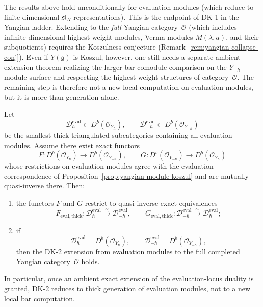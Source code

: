 \begin{remark}
\label{rem:yangian-cat-O-conditional}
The results above hold unconditionally for
evaluation modules (which reduce to finite-dimensional
$\mathfrak{sl}_N$-representations). This is the endpoint of DK-1 in
the Yangian ladder. Extending to
the \emph{full} Yangian category~$\mathcal{O}$ (which
includes infinite-dimensional highest-weight modules,
Verma modules $M(\lambda, a)$, and their subquotients) requires
the Koszulness conjecture
\textup{(}Remark~\ref{rem:yangian-collapse-conj}\textup{)}.
Even if $Y(\mathfrak{g})$ is Koszul, however, one still needs a
separate ambient extension theorem realizing the larger bar-comodule
comparison on the $Y_{-\hbar}$ module surface and respecting the
highest-weight structures of category~$\mathcal{O}$. The remaining
step is therefore not a new local computation on evaluation modules,
but it is more than generation alone.
\end{remark}

\begin{proposition}
\label{prop:yangian-dk2-thick-generation}
Let
\[
\mathcal{D}_{\hbar}^{\mathrm{eval}}
\subset D^b(\mathcal{O}_{Y_\hbar}),
\qquad
\mathcal{D}_{-\hbar}^{\mathrm{eval}}
\subset D^b(\mathcal{O}_{Y_{-\hbar}})
\]
be the smallest thick triangulated subcategories containing all
evaluation modules. Assume there exist exact functors
\[
F\colon D^b(\mathcal{O}_{Y_\hbar}) \to D^b(\mathcal{O}_{Y_{-\hbar}}),
\qquad
G\colon D^b(\mathcal{O}_{Y_{-\hbar}}) \to D^b(\mathcal{O}_{Y_\hbar})
\]
whose restrictions on evaluation modules agree with the evaluation
correspondence of Proposition~\ref{prop:yangian-module-koszul} and are
mutually quasi-inverse there. Then:
\begin{enumerate}[label=\textup{(\roman*)}]
\item the functors $F$ and $G$ restrict to quasi-inverse exact
 equivalences
 \[
 F_{\mathrm{eval,thick}}\colon
 \mathcal{D}_{\hbar}^{\mathrm{eval}}
 \xrightarrow{\sim}
 \mathcal{D}_{-\hbar}^{\mathrm{eval}},
 \qquad
 G_{\mathrm{eval,thick}}\colon
 \mathcal{D}_{-\hbar}^{\mathrm{eval}}
 \xrightarrow{\sim}
 \mathcal{D}_{\hbar}^{\mathrm{eval}};
 \]
\item if
 \[
 \mathcal{D}_{\hbar}^{\mathrm{eval}}
 = D^b(\mathcal{O}_{Y_\hbar}),
 \qquad
 \mathcal{D}_{-\hbar}^{\mathrm{eval}}
 = D^b(\mathcal{O}_{Y_{-\hbar}}),
 \]
 then the DK-2 extension from evaluation modules to the full
 completed Yangian category~$\mathcal{O}$ holds.
\end{enumerate}
In particular, once an ambient exact extension of the evaluation-locus
duality is granted, DK-2 reduces to thick generation of evaluation
modules, not to a new local bar computation.
\end{proposition}

